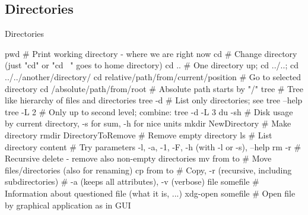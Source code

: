 \documentclass[compress, ucs, xelatex, 11pt, xcolor=svgnames, aspectratio=169,
	hyperref={
		bookmarks=true,
		unicode=true,
		colorlinks=true,
		pdftitle={Linux, command line and MetaCentrum},
		plainpages=false,
		pdfauthor={Vojtech Zeisek},
		pdfsubject={Course about use of Linux command line, writing shell scripts and using MetaCentrum of CESNET},
		pdfcreator={XeLaTeX},
		pdfkeywords={Linux, GNU, BASH, shell, command line, MetaCentrum},
		linkcolor=DarkRed, %
		anchorcolor=DarkBlue, %
		citecolor=Indigo, %
		filecolor=NavyBlue, %
		menucolor=DarkMagenta, %
		urlcolor=DarkBlue, %
		pdftex},
	url={hyphens, lowtilde} %
	]{beamer}
\begin{document}
\subsection{Directories}

\begin{frame}[fragile]{Directories}
	\begin{bashcode}
    pwd # Print working directory - where we are right now
    cd # Change directory (just "cd" or "cd ~" goes to home directory)
    cd .. # One directory up; cd ../..; cd ../../another/directory/
    cd relative/path/from/current/position # Go to selected directory
    cd /absolute/path/from/root # Absolute path starts by "/"
    tree # Tree like hierarchy of files and directories
    tree -d # List only directories; see tree --help
    tree -L 2 # Only up to second level; combine: tree -d -L 3
    du -sh # Disk usage by current directory, -s for sum, -h for nice units
    mkdir NewDirectory # Make directory
    rmdir DirectoryToRemove # Remove empty directory
    ls # List directory content
       # Try parameters -l, -a, -1, -F, -h (with -l or -s), --help
    rm -r # Recursive delete - remove also non-empty directories
    mv from to # Move files/directories (also for renaming)
    cp from to # Copy, -r (recursive, including subdirectories)
               # -a (keeps all attributes), -v (verbose)
    file somefile # Information about questioned file (what it is, ...)
    xdg-open somefile # Open file by graphical application as in GUI
	\end{bashcode}
\end{frame}
\end{document}
